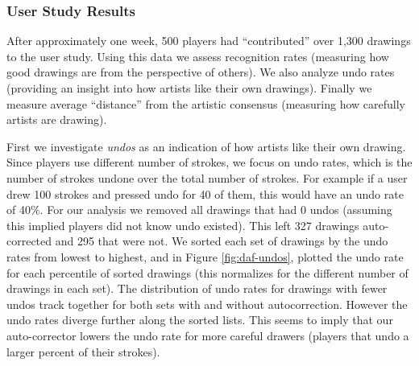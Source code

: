 

\subsubsection {User Study Results}

After approximately one week, 500 players had ``contributed'' over 1,300 drawings to the user study. Using this data we assess recognition rates (measuring how good drawings are from the perspective of others). We also analyze undo rates (providing an insight into how artists like their own drawings). Finally we measure average ``distance'' from the artistic consensus (measuring how carefully artists are drawing).



First we investigate {\em undos} as an indication of how artists like their own drawing. Since players use different number
of strokes, we focus on undo rates, which is the number of strokes undone over the total number of strokes. For example if
a user drew 100 strokes and pressed undo for 40 of them, this would have an undo rate of 40\%. For our analysis we removed
all drawings that had 0 undos (assuming this implied players did not know undo existed). This left 327 drawings auto-corrected
 and 295 that were not. We sorted each set of drawings by the undo rates from lowest to highest, and in Figure
\ref{fig:daf-undos}, plotted the undo rate for each percentile of sorted drawings (this normalizes for the different
number of drawings in each set). The distribution of undo rates for drawings with fewer undos track together for both
sets with and without autocorrection. However the undo rates diverge further along the sorted lists. This seems to imply
that our auto-corrector lowers the undo rate for more careful drawers (players that undo a larger percent of their
strokes).


